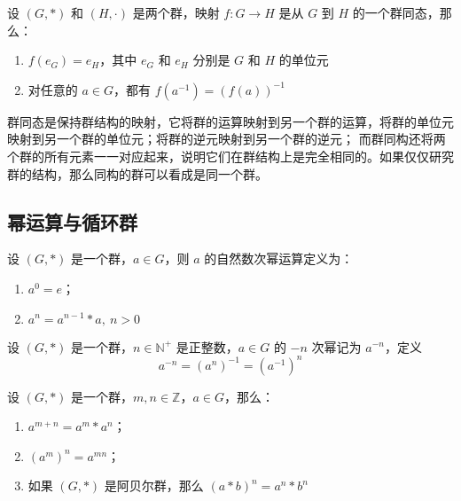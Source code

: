 \begin{proposition}[群同态的性质]
    设 $(G, *)$ 和 $(H, \cdot)$ 是两个群，映射 $f: G \to H$ 是从 $G$ 到 $H$ 的一个群同态，那么：
    \begin{enumerate}
        \item $f(e_G) = e_H$，其中 $e_G$ 和 $e_H$ 分别是 $G$ 和 $H$ 的单位元
        \item 对任意的 $a\in G$，都有 $f(a^{-1}) = (f(a))^{-1}$
    \end{enumerate}
\end{proposition}

\begin{note}
    群同态是保持群结构的映射，它将群的运算映射到另一个群的运算，将群的单位元映射到另一个群的单位元；将群的逆元映射到另一个群的逆元；
    而群同构还将两个群的所有元素一一对应起来，说明它们在群结构上是完全相同的。如果仅仅研究群的结构，那么同构的群可以看成是同一个群。
\end{note}

\vspace{1em}
\subsection{幂运算与循环群}
\begin{definition}[群元素的自然数次幂运算]
    设 $(G, *)$ 是一个群，$a\in G$，则 $a$ 的自然数次幂运算定义为：
    \begin{enumerate}
        \item $a^0 = e$；
        \item $a^n = a^{n-1} * a,\ n > 0$
    \end{enumerate}
\end{definition}

\begin{definition}[群元素的负整数次幂运算]
    设 $(G, *)$ 是一个群，$n\in\mathbb{N}^+$ 是正整数，$a\in G$ 的 $-n$ 次幂记为 $a^{-n}$，定义
    \[
        a^{-n} = (a^n)^{-1} = (a^{-1})^n
    \]
\end{definition}

\begin{proposition}[群元素的整数次幂运算的性质]
    设 $(G, *)$ 是一个群，$m, n\in\mathbb{Z}$，$a\in G$，那么：
    \begin{enumerate}
        \item $a^{m+n} = a^m * a^n$；
        \item $(a^m)^n = a^{mn}$；
        \item 如果 $(G, *)$ 是阿贝尔群，那么 $(a * b)^n = a^n * b^n$
    \end{enumerate}
\end{proposition}

